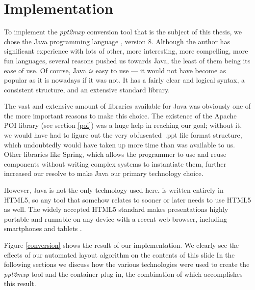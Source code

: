 
 \chapter{Implementation}
  \label{implementation}

  To implement the \emph{ppt2mxp} conversion tool that is the subject of this
  thesis, we chose the Java programming language \citep{gosling-1}, version 8.
  Although the author has significant experience with lots of other, more
  interesting, more compelling, more fun languages, several reasons pushed us
  towards Java, the least of them being its ease of use. Of course, Java
  \emph{is} easy to use --- it would not have become as popular as it is
  nowadays if it was not. It has a fairly clear and logical syntax, a consistent
  structure, and an extensive standard library.
 
  The vast and extensive amount of libraries available for Java was obviously
  one of the more important reasons to make this choice. The existence of the
  Apache POI library (see section \ref{poi}) was a huge help in reaching our
  goal; without it, we would have had to figure out the very obfuscated\ .ppt
  file format structure, which undoubtedly would have taken up more time than
  was available to us. Other libraries like Spring, which allows the programmer
  to use and reuse components without writing complex systems to instantiate
  them, further increased our resolve to make Java our primary technology
  choice.

  However, Java is not the only technology used here. \mxp is written entirely
  in HTML5, so any tool that somehow relates to \mxp sooner or later needs to
  use HTML5 as well. The widely accepted HTML5 standard makes \mxp
  presentations highly portable and runnable on any device with a recent web
  browser, including smartphones and tablets \citep{roels-1}.


  Figure \ref{conversion} shows the result of our implementation. We clearly
  see the effects of our automated layout algorithm on the contents of this
  slide In the following sections we discuss how the various technologies were
  used to create the \emph{ppt2mxp} tool and the  container
  plug-in, the combination of which accomplishes this result.

